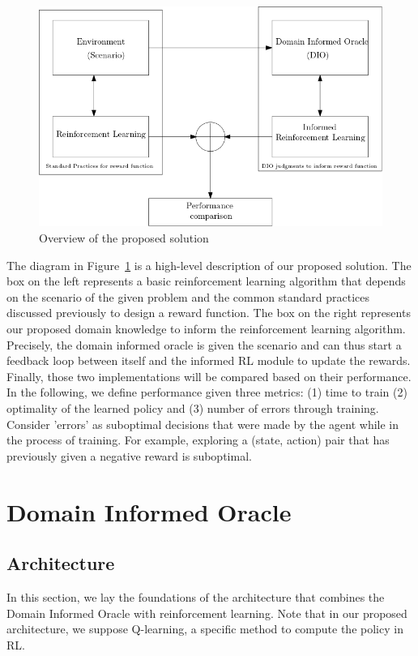 \documentclass[a4paper,11pt]{article}
\theoremstyle{definition}
\begin{document}
\begin{figure}[H]
  \centering
  \includegraphics[scale=0.5]{overview.png}
  \caption{Overview of the proposed solution}
  \label{fig:overview}
\end{figure}

The diagram in Figure~\ref{fig:overview} is a high-level description of our proposed solution. 
%
The box on the left represents a basic reinforcement learning algorithm that depends on the scenario of the given problem and 
the common standard practices discussed previously to design a reward function. 
%
The box on the right represents our proposed domain knowledge to inform the reinforcement learning algorithm. 
Precisely, the domain informed oracle is given the scenario and can thus start a feedback loop between itself and 
the informed RL module to update the rewards. 
%
Finally, those two implementations will be compared based on their performance. In the following, we define performance 
given three metrics: (1) time to train (2) optimality of the learned policy and (3) number of errors through training. 
Consider 'errors' as suboptimal decisions that were made by the agent while in the process of training. For example, exploring a (state, action) pair 
that has previously given a negative reward is suboptimal. 

\section{Domain Informed Oracle} 
\subsection{Architecture}
In this section, we lay the foundations of the architecture that combines the Domain Informed Oracle with 
reinforcement learning. Note that in our proposed architecture, we suppose Q-learning, a specific method to compute the policy in RL. 
\end{document}

